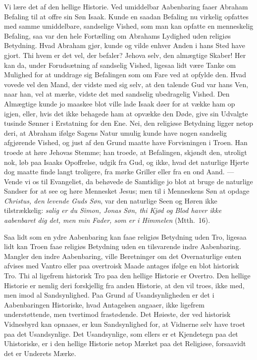 \documentclass[12pt]{book}
\begin{document}
Vi lære det af den hellige Historie. Ved umiddelbar Aabenbaring
faaer Abraham Befaling til at offre sin Søn Isaak. Kunde en saadan
Befaling nu virkelig opfattes med samme umiddelbare, sandselige
Vished, som man kan opfatte en menneskelig Befaling, saa var den
hele Fortælling om Abrahams Lydighed uden religiøs Betydning. Hvad
Abraham gjør, kunde og vilde enhver Anden i hans Sted have gjort.
Thi hvem er det vel, der befaler? Jehova selv, den almægtige Skaber!
Her kan da, under Forudsætning af sandselig Vished, ligesaa lidt
være Tanke om Mulighed for at unddrage sig Befalingen som om Fare
ved at opfylde den. Hvad vovede vel den Mand, der vidste med sig
selv, at den talende Gud var hans Ven, naar han, vel at mærke,
vidste det med sandselig ubedragelig Vished. Den Almægtige kunde jo
maaskee blot ville lade Isaak døer for at vække ham op igjen, eller,
hvis det ikke behagede ham at opvække den Døde, give sin Udvalgte
tusinde Sønner i Erstatning for den Ene. Nei, den religiøse
Betydning ligger netop deri, at Abraham ifølge Sagens Natur umulig
kunde have nogen sandselig afgjørende Vished, og just af den Grund
maatte have Forvisningen i Troen. Han troede at høre Jehovas Stemme;
han troede, at Befalingen, skjøndt den, utroligt nok, løb paa Isaaks
Opoffrelse, udgik fra Gud, og ikke, hvad det naturlige Hjerte dog
maatte finde langt troligere, fra mørke Griller eller fra en ond
Aand. --- Vende vi os til Evangeliet, da behøvede de Samtidige jo
blot at bruge de naturlige Sandser for at see og høre
Mennesket Jesus; men til i Menneskens Søn at opdage \emph{Christus,
den levende Guds Søn}, var den naturlige Seen og Høren ikke
tilstrækkelig: \emph{salig er du Simon, Jonas Søn, thi Kjød og Blod
haver ikke aabenbaret dig det, men min Fader, som er i Himmelen}
(Mtth.\ 16).

Saa lidt som en ydre Aabenbaring kan faae religiøs Betydning uden
Tro, ligesaa lidt kan Troen faae religiøs Betydning uden en
tilsvarende indre Aabenbaring. Mangler den indre Aabenbaring, ville
Beretninger om det Overnaturlige enten afvises med Vantro eller paa
overtroisk Maade antages ifølge en blot historisk Tro. Thi al
ligefrem historisk Tro paa den hellige Historie er Overtro. Den
hellige Historie er nemlig deri forskjellig fra anden Historie, at
den vil troes, ikke med, men imod al Sandsynlighed. Paa Grund af
Usandsynligheden er det i Aabenbaringen Historiske, hvad Antagelsen
angaaer, ikke ligefrem understøttende, men tvertimod frastødende.
Det Høieste, der ved historisk Vidnesbyrd kan opnaaes, er kun
Sandsynlighed for, at Vidnerne selv have troet paa det
Usandsynlige. Det Usandsynlige, som ellers er et Kjendetegn paa det
Uhistoriske, er i den hellige Historie netop Mærket paa det
Religiøse, forsaavidt det er Underets Mærke.
\end{document}
